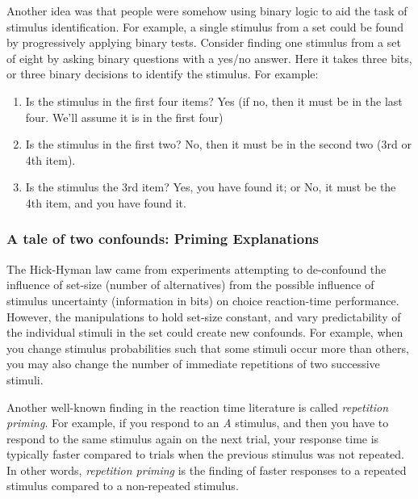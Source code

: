 \documentclass[
  oneside,
  12pt]{crumpbook}
\providecommand{\tightlist}{%
  \setlength{\itemsep}{0pt}\setlength{\parskip}{0pt}}
\begin{document}
Another idea was that people were somehow using binary logic to aid the task of stimulus identification. For example, a single stimulus from a set could be found by progressively applying binary tests. Consider finding one stimulus from a set of eight by asking binary questions with a yes/no answer. Here it takes three bits, or three binary decisions to identify the stimulus. For example:

\begin{enumerate}
\def\labelenumi{\arabic{enumi}.}
\tightlist
\item
  Is the stimulus in the first four items? Yes (if no, then it must be in the last four. We'll assume it is in the first four)
\item
  Is the stimulus in the first two? No, then it must be in the second two (3rd or 4th item).
\item
  Is the stimulus the 3rd item? Yes, you have found it; or No, it must be the 4th item, and you have found it.
\end{enumerate}

\hypertarget{a-tale-of-two-confounds-priming-explanations}{%
\subsubsection{A tale of two confounds: Priming Explanations}\label{a-tale-of-two-confounds-priming-explanations}}

The Hick-Hyman law came from experiments attempting to de-confound the influence of set-size (number of alternatives) from the possible influence of stimulus uncertainty (information in bits) on choice reaction-time performance. However, the manipulations to hold set-size constant, and vary predictability of the individual stimuli in the set could create new confounds. For example, when you change stimulus probabilities such that some stimuli occur more than others, you may also change the number of immediate repetitions of two successive stimuli.

Another well-known finding in the reaction time literature is called \emph{repetition priming}. For example, if you respond to an \emph{A} stimulus, and then you have to respond to the same stimulus again on the next trial, your response time is typically faster compared to trials when the previous stimulus was not repeated. In other words, \emph{repetition priming} is the finding of faster responses to a repeated stimulus compared to a non-repeated stimulus.
\end{document}
